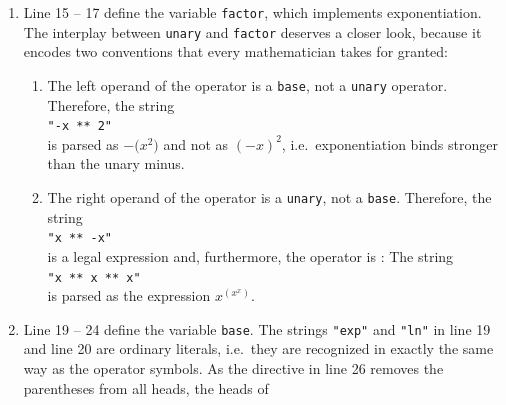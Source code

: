 \begin{enumerate}
      The construct ``\texttt{-> neg}'' at the end of line 11 is an
      .  An alias replaces the head of the tuple that is
      built for the alternative.  Without this alias, the head would be the literal \squoted{-} and a negation
      could only be distinguished from a subtraction by the number of components of its tuple.  With the alias,
      a negation is represented by a tuple of the form \texttt{('neg', $\textsl{ast}$)}.
\item Line 15 -- 17 define the variable \texttt{factor}, which implements exponentiation.  The interplay
      between \texttt{unary} and \texttt{factor} deserves a closer look, because it encodes two
      conventions that every mathematician takes for granted:
      \begin{enumerate}
      \item The left operand of the operator \squoted{**} is a \texttt{base}, not a \texttt{unary} operator.
            Therefore, the string
            \\[0.2cm]
            \hspace*{1.3cm}
            \texttt{"-x ** 2"}
            \\[0.2cm]
            is parsed as $-\bigl(x^2\bigr)$ and not as
            $(-x)^2$, i.e.~exponentiation binds stronger than the unary minus.
      \item The right operand of the operator \squoted{**} is a \texttt{unary}, not a \texttt{base}.
            Therefore, the string
            \\[0.2cm]
            \hspace*{1.3cm}
            \texttt{"x ** -x"}
            \\[0.2cm]
            is a legal expression and, furthermore, the operator
            \squoted{**} is :  The string
            \\[0.2cm]
            \hspace*{1.3cm}
            \texttt{"x ** x ** x"}
            \\[0.2cm] is parsed as the expression $x^{\left(x^x\right)}$.
      \end{enumerate}
\item Line 19 -- 24 define the variable \texttt{base}.  The strings \texttt{"exp"} and \texttt{"ln"} in
      line 19 and line 20 are ordinary literals, i.e.~they are recognized in exactly the same way as the
      operator symbols.  As the directive in line 26 removes the parentheses from all heads, the heads of

\end{enumerate}
